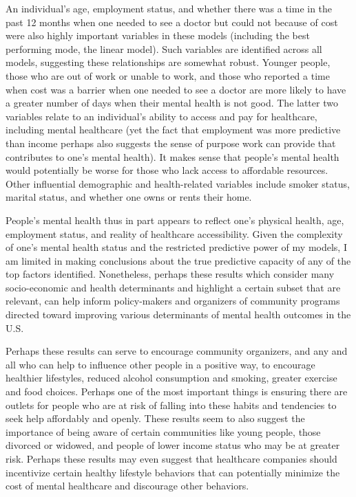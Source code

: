 \documentclass[
]{article}
\begin{document}
An individual's age, employment status, and whether there was a time in the past 12 months when one needed to see a doctor but could not because of cost were also highly important variables in these models (including the best performing mode, the linear model). Such variables are identified across all models, suggesting these relationships are somewhat robust. Younger people, those who are out of work or unable to work, and those who reported a time when cost was a barrier when one needed to see a doctor are more likely to have a greater number of days when their mental health is not good. The latter two variables relate to an individual's ability to access and pay for healthcare, including mental healthcare (yet the fact that employment was more predictive than income perhaps also suggests the sense of purpose work can provide that contributes to one's mental health). It makes sense that people's mental health would potentially be worse for those who lack access to affordable resources. Other influential demographic and health-related variables include smoker status, marital status, and whether one owns or rents their home.

People's mental health thus in part appears to reflect one's physical health, age, employment status, and reality of healthcare accessibility. Given the complexity of one's mental health status and the restricted predictive power of my models, I am limited in making conclusions about the true predictive capacity of any of the top factors identified. Nonetheless, perhaps these results which consider many socio-economic and health determinants and highlight a certain subset that are relevant, can help inform policy-makers and organizers of community programs directed toward improving various determinants of mental health outcomes in the U.S.

Perhaps these results can serve to encourage community organizers, and any and all who can help to influence other people in a positive way, to encourage healthier lifestyles, reduced alcohol consumption and smoking, greater exercise and food choices. Perhaps one of the most important things is ensuring there are outlets for people who are at risk of falling into these habits and tendencies to seek help affordably and openly. These results seem to also suggest the importance of being aware of certain communities like young people, those divorced or widowed, and people of lower income status who may be at greater risk. Perhaps these results may even suggest that healthcare companies should incentivize certain healthy lifestyle behaviors that can potentially minimize the cost of mental healthcare and discourage other behaviors.
\end{document}
